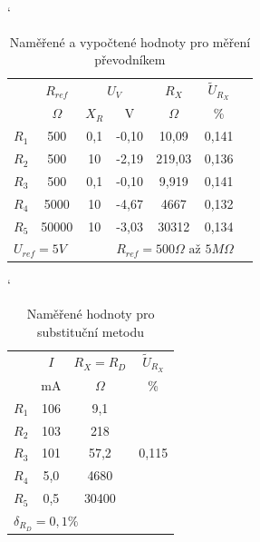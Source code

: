 \documentclass[a4paper, czech]{article}
\begin{document}
\begin{table}[H]
    \catcode`
    \centering
    \caption{Naměřené a vypočtené hodnoty pro měření převodníkem}
    \begin{tabular}{lcccccc}
        \toprule
        \multirow{2}{*}{} & $R_{ref}$ & \multicolumn{2}{c}{$U_V$} & $R_X$   & $\tilde{U}_{R_X}$ \\
        \cmidrule(rl){2-2} 
        \cmidrule(rl){3-4}
        \cmidrule(rl){5-5}
        \cmidrule(rl){6-6}
        & $\Omega$      & $X_R$         & V           & $\Omega$      & \%      \\ 
        \midrule
        $R_1$                & 500    & 0,1        & -0,10       & 10,09  & 0,141   \\ 
        $R_2$                & 500    & 10         & -2,19       & 219,03 & 0,136   \\ 
        $R_3$                & 500    & 0,1        & -0,10       & 9,919  & 0,141   \\ 
        $R_4$                & 5000   & 10         & -4,67       & 4667   & 0,132   \\ 
        $R_5$                & 50000  & 10         & -3,03       & 30312  & 0,134   \\ 
        \bottomrule
        \multicolumn{3}{l}{$U_{ref} = 5V$} & \multicolumn{3}{l}{$R_{ref} = 500 \Omega \text{ až } 5 M \Omega $}
    \end{tabular}
\end{table}

\begin{table}[H]
    \catcode`
    \centering
    \caption{Naměřené hodnoty pro substituční metodu}
    \begin{tabular}{lccc}
        \toprule
        \multirow{2}{*}{} & $I$   & $R_X = R_D$ & $\tilde{U}_{R_X}$                \\
        \cmidrule(rl){2-2}
        \cmidrule(rl){3-3}
        \cmidrule(rl){4-4}
                                     & mA  & $\Omega$           & \%                     \\
        \midrule
        $R_1$                           & 106 & 9,1         & \multirow{5}{*}{0,115} \\
        $R_2$                           & 103 & 218         &                        \\
        $R_3$                           & 101 & 57,2        &                        \\
        $R_4$                           & 5,0   & 4680        &                        \\
        $R_5$                           & 0,5 & 30400       &                       \\
        \bottomrule
        \multicolumn{3}{l}{$\delta_{R_D} = 0,1\%$}
    \end{tabular}
\end{table}
\end{document}

